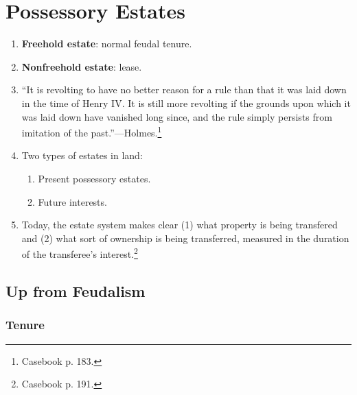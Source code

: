 \section{Possessory Estates}

\begin{enumerate}
    \item \textbf{Freehold estate}: normal feudal tenure.
    \item \textbf{Nonfreehold estate}: lease.
    \item ``It is revolting to have no better reason for a rule than that it 
    was laid down in the time of Henry IV. It is still more revolting if the 
    grounds upon which it was laid down have vanished long since, and the rule 
    simply persists from imitation of the past.''---Holmes.\footnote{Casebook 
    p. 183.}
    \item Two types of estates in land:
    \begin{enumerate}
        \item Present possessory estates.
        \item Future interests.
    \end{enumerate}
    \item Today, the estate system makes clear (1) what property is being 
    transfered and (2) what sort of ownership is being transferred, measured 
    in the duration of the transferee's interest.\footnote{Casebook p. 191.}
\end{enumerate}

\subsection{Up from Feudalism}

\subsubsection{Tenure}

